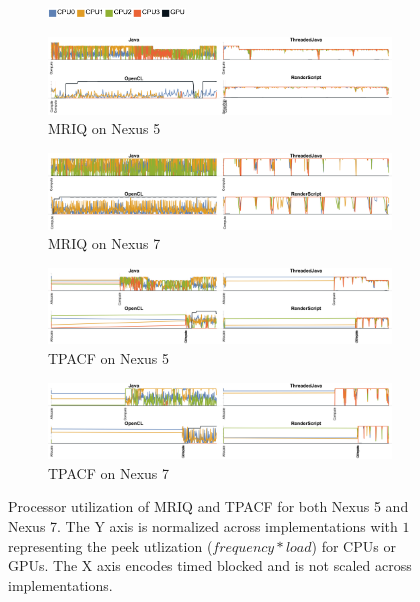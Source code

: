 \begin{figure}[ht]
  \centering

  \begin{subfigure}[b]{\textwidth}
          \centering
          \includegraphics[width=0.4\textwidth]{data/load_legend.pdf}
  \end{subfigure}

  \begin{subfigure}[b]{0.9\textwidth}
      \centering
      \includegraphics[width=\textwidth]{data/load_mriq_nexus5.pdf}
      \caption{MRIQ on Nexus 5}
      \label{fig:MRIQ5}
  \end{subfigure}
  \begin{subfigure}[b]{0.9\textwidth}
      \centering
      \includegraphics[width=\textwidth]{data/load_mriq_nexus7.pdf}
      \caption{MRIQ on Nexus 7}
      \label{fig:MRIQ7}
  \end{subfigure}

  \begin{subfigure}[b]{0.9\textwidth}
      \centering
      \includegraphics[width=\textwidth]{data/load_tpacf_nexus5.pdf}
      \caption{TPACF on Nexus 5}
      \label{fig:TPACF5}
  \end{subfigure}
  \begin{subfigure}[b]{0.9\textwidth}
      \centering
      \includegraphics[width=\textwidth]{data/load_tpacf_nexus7.pdf}
      \caption{TPACF on Nexus 7}
      \label{fig:TPACF7}
  \end{subfigure}

  \caption{Processor utilization of MRIQ and TPACF for both Nexus 5 and Nexus 7. The Y axis is normalized across implementations with $1$ representing the peek utlization ($frequency*load$) for CPUs or GPUs. The X axis encodes timed blocked and is not scaled across implementations.}
  \label{fig:loadMRIQTpacf}
\end{figure}
